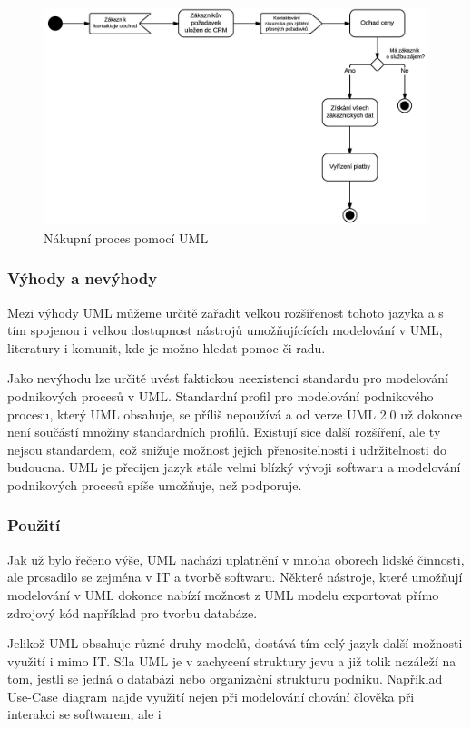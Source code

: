 \documentclass[]{article}
\begin{document}
\begin{figure}[H]\centering
\includegraphics[width=1.0\textwidth]{obrazky/uml_nakupniproces}
\caption{Nákupní proces pomocí UML}
\label{fig:UML_nakupniproces}
\end{figure}

\subsubsection{Výhody a nevýhody}
Mezi výhody UML můžeme určitě zařadit velkou rozšířenost tohoto jazyka a s tím spojenou i velkou dostupnost nástrojů umožňujícících modelování v UML, literatury i komunit, kde je možno hledat pomoc či radu.

Jako nevýhodu lze určitě uvést faktickou neexistenci standardu pro modelování podnikových procesů v UML. Standardní profil pro modelování podnikového procesu, který UML obsahuje, se příliš nepoužívá a od verze UML 2.0 už dokonce není součástí množiny standardních profilů. \cite{Repa2007} Existují sice další rozšíření, ale ty nejsou standardem, což snižuje možnost jejich přenositelnosti i udržitelnosti do budoucna. UML je přecijen jazyk stále velmi blízký vývoji softwaru a modelování podnikových procesů spíše umožňuje, než podporuje.

\subsubsection{Použití}
Jak už bylo řečeno výše, UML nachází uplatnění v mnoha oborech lidské činnosti, ale prosadilo se zejména v IT a tvorbě softwaru. Některé nástroje, které umožňují modelování v UML dokonce nabízí možnost z UML modelu exportovat přímo zdrojový kód například pro tvorbu databáze.

Jelikož UML obsahuje různé druhy modelů, dostává tím celý jazyk další možnosti využití i mimo IT. Síla UML je v zachycení struktury jevu a již tolik nezáleží na tom, jestli se jedná o databázi nebo organizační strukturu podniku. Například Use-Case diagram najde využití nejen při modelování chování člověka při interakci se softwarem, ale i 
\end{document}
